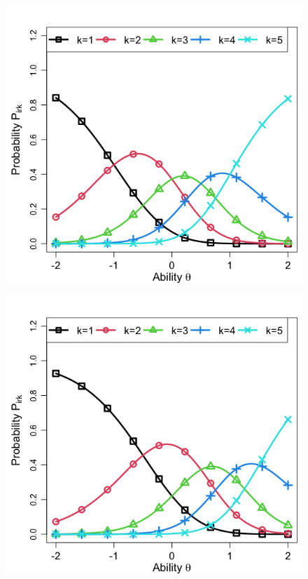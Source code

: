 \documentclass[a4paper,11pt,oneside,openany]{jsbook}
\begin{document}
\begin{center}
  \begin{figure}[]
  \begin{minipage}[b]{0.3\linewidth}
    \centering
    \includegraphics[keepaspectratio,scale=0.22]{img/icc1.png}
    \label{1}
  \end{minipage}
  \begin{minipage}[b]{0.3\linewidth}
    \centering
    \includegraphics[keepaspectratio,scale=0.22]{img/icc2.png}

\end{minipage}
\end{figure}
\end{center}
\end{document}
